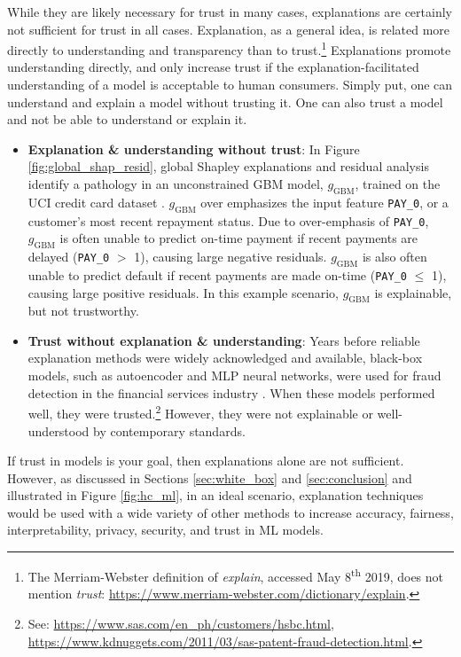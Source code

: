 \documentclass[sigconf]{acmart}
\begin{document}
While they are likely necessary for trust in many cases, explanations are certainly not sufficient for trust in all cases. Explanation, as a general idea, is related more directly to understanding and transparency than to trust.\footnote{The Merriam-Webster definition of \textit{explain}, accessed May 8\textsuperscript{th} 2019, does not mention \textit{trust}: \url{https://www.merriam-webster.com/dictionary/explain}.} Explanations promote understanding directly, and only increase trust if the explanation-facilitated understanding of a model is acceptable to human consumers. Simply put, one can understand and explain a model without trusting it. One can also trust a model and not be able to understand or explain it. 

\begin{itemize}

\item \textbf{Explanation \& understanding without trust}: In Figure \ref{fig:global_shap_resid}, global Shapley explanations and residual analysis identify a pathology in an unconstrained GBM model, $g_{\text{GBM}}$, trained on the UCI credit card dataset \cite{uci}. $g_{\text{GBM}}$ over emphasizes the input feature \texttt{PAY\_0}, or a customer's most recent repayment status. Due to over-emphasis of \texttt{PAY\_0}, $g_{\text{GBM}}$ is often unable to predict on-time payment if recent payments are delayed (\texttt{PAY\_0} $>$ 1), causing large negative residuals. $g_{\text{GBM}}$ is also often unable to predict default if recent payments are made on-time (\texttt{PAY\_0} $\leq$ 1), causing large positive residuals. In this example scenario, $g_{\text{GBM}}$ is explainable, but not trustworthy. 

\item \textbf{Trust without explanation \& understanding}: Years before reliable explanation methods were widely acknowledged and available, black-box models, such as autoencoder and MLP neural networks, were used for fraud detection in the financial services industry \cite{gopinathan1998fraud}. When these models performed well, they were trusted.\footnote{See: \url{https://www.sas.com/en_ph/customers/hsbc.html}, \url{https://www.kdnuggets.com/2011/03/sas-patent-fraud-detection.html}.} However, they were not explainable or well-understood by contemporary standards.  

\end{itemize}

If trust in models is your goal, then explanations alone are not sufficient. However, as discussed in Sections \ref{sec:white_box} and \ref{sec:conclusion} and illustrated in Figure \ref{fig:hc_ml}, in an ideal scenario, explanation techniques would be used with a wide variety of other methods to increase accuracy, fairness, interpretability, privacy, security, and trust in ML models. 
\end{document}
